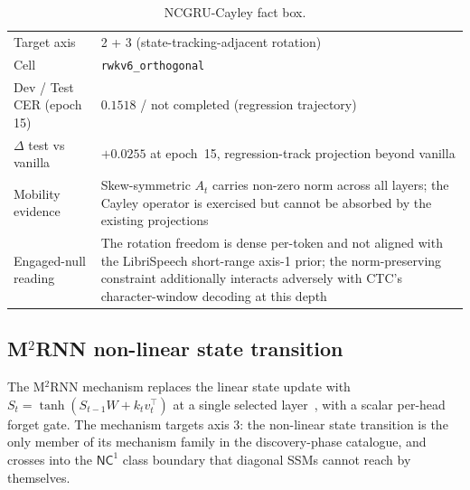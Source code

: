 \begin{table}[h]
\centering
\small
\caption[NCGRU-Cayley engaged-null entry]{NCGRU-Cayley fact box.}
\label{tab:engaged-null:cayley}
\setlength{\tabcolsep}{6pt}
\renewcommand{\arraystretch}{1.05}
\begin{tabularx}{\linewidth}{@{}p{3.3cm} X@{}}
\toprule
Target axis & 2 + 3 (state-tracking-adjacent rotation) \\
Cell & \texttt{rwkv6\_orthogonal} \\
Dev / Test CER (epoch 15) & $0.1518$ / not completed (regression
trajectory) \\
$\Delta$ test vs vanilla & $+0.0255$ at epoch~15, regression-track
projection beyond vanilla \\
Mobility evidence & Skew-symmetric $A_{t}$ carries non-zero norm
across all layers; the Cayley operator is exercised but cannot be
absorbed by the existing projections \\
Engaged-null reading & The rotation freedom is dense per-token and
not aligned with the LibriSpeech short-range axis-1 prior; the
norm-preserving constraint additionally interacts adversely with
CTC's character-window decoding at this depth \\
\bottomrule
\end{tabularx}
\end{table}

\subsection{M$^{2}$RNN non-linear state transition}\label{app:engaged-null:m2rnn}

The M$^{2}$RNN mechanism replaces the linear state update with
$S_{t} = \tanh(S_{t-1} W + k_{t} v_{t}^{\top})$ at a single
selected layer~\cite{mishra2026m2rnn}, with a scalar per-head forget
gate. The mechanism targets axis 3: the non-linear state transition
is the only member of its mechanism family in the discovery-phase
catalogue, and crosses into the $\mathsf{NC}^{1}$ class boundary that
diagonal SSMs cannot reach by themselves.

